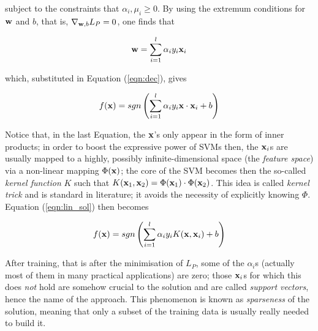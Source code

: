 \noindent subject to the constraints that $\alpha_i,\mu_i\geq 0$. By
using the extremum conditions for $\mathbf{w}$ and $b$, that is,
$\nabla_{\mathbf{w},b} L_P = 0$, one finds that

\begin{equation} \label{eqn:w1}
  \mathbf{w} = \sum_{i=1}^l \alpha_i y_i \mathbf{x}_i
\end{equation}

\noindent which, substituted in Equation (\ref{eqn:dec}), gives

\begin{equation} \label{eqn:lin_sol}
  f(\mathbf{x}) = sgn \left( \sum_{i=1}^l \alpha_i y_i \mathbf{x} \cdot \mathbf{x}_i + b \right)
\end{equation}

Notice that, in the last Equation, the $\mathbf{x}$'s only appear in the form
of inner products; in order to boost the expressive power of SVMs
then, the $\mathbf{x}_i$s are usually mapped to a highly, possibly
infinite-dimensional space (the \emph{feature space}) via a
non-linear mapping $\Phi(\mathbf{x})$; the core of the SVM becomes then the
so-called \emph{kernel function} $K$ such that $K(\mathbf{x}_1,\mathbf{x}_2) =
\Phi(\mathbf{x}_1)\cdot\Phi(\mathbf{x}_2)$. This idea is called \emph{kernel trick}
and is standard in literature; it avoids the necessity of explicitly
knowing $\Phi$. Equation (\ref{eqn:lin_sol}) then becomes

\begin{equation} \label{eqn:sol}
  f(\mathbf{x}) = sgn \left( \sum_{i=1}^l \alpha_i y_i K(\mathbf{x},\mathbf{x}_i) + b \right)
\end{equation}

After training, that is after the minimisation of $L_P$, some of the
$\alpha_i$s (actually most of them in many practical applications) are
zero; those $\mathbf{x}_i$s for which this does \emph{not} hold are somehow
crucial to the solution and are called \emph{support vectors}, hence
the name of the approach. This phenomenon is known as
\emph{sparseness} of the solution, meaning that only a subset of the
training data is usually really needed to build it.
